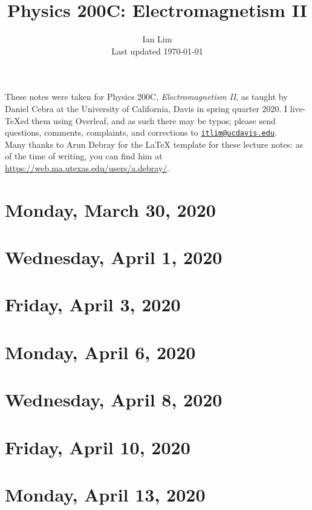 \documentclass{../mynotes}
\begin{document}
\title{Physics 200C: Electromagnetism II}
\author{Ian Lim\\ Last updated \today}
\maketitle
{\small\noindent These notes were taken for Physics 200C, \emph{Electromagnetism II}, as taught by Daniel Cebra at the University of California, Davis in spring quarter 2020. I live-\TeX ed them using Overleaf, and as such there may be typos; please send questions, comments, complaints, and corrections to 
\href{mailto:itlim@ucdavis.edu?subject=200C\%20Lecture\%20Notes}{\texttt{itlim@ucdavis.edu}}.\\
Many thanks to Arun Debray for the {\LaTeX} template for these lecture notes: as of the time of writing, you can find him at \url{https://web.ma.utexas.edu/users/a.debray/}.}

\tableofcontents

\section{Monday, March 30, 2020}
	
\section{Wednesday, April 1, 2020}
    
\section{Friday, April 3, 2020}
    
    
\section{Monday, April 6, 2020}
    
\section{Wednesday, April 8, 2020}  
    
\section{Friday, April 10, 2020}  
    

\section{Monday, April 13, 2020}
    
\end{document}
